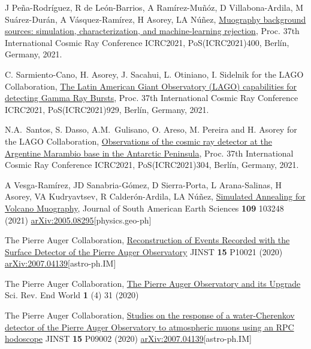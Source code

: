 \begin{etaremune}
\item {} J Peña-Rodríguez, R de León-Barrios, A Ramírez-Muñóz, D Villabona-Ardila, M Suárez-Durán, A Vásquez-Ramírez, H Asorey, LA Núñez, \href{https://doi.org/10.22323/1.395.0400}{Muography background sources: simulation, characterization, and machine-learning rejection}, \en Proc.
37th International Cosmic Ray Conference ICRC2021, PoS(ICRC2021)400, Berlín, Germany, 2021.

\item {} C. Sarmiento-Cano, H. Asorey, J. Sacahui, L. Otiniano, I. Sidelnik for the LAGO Collaboration, \href{https://doi.org/10.22323/1.395.0929}{The Latin American Giant Observatory (LAGO) capabilities for detecting Gamma Ray Bursts}, \en Proc.
37th International Cosmic Ray Conference ICRC2021, PoS(ICRC2021)929, Berlín, Germany, 2021.

\item {} N.A.\ Santos, S. Dasso, A.M.\ Gulisano, O. Areso, M. Pereira and H. Asorey for the LAGO Collaboration, \href{https://doi.org/10.22323/1.395.304}{Observations of the cosmic ray detector at the Argentine Marambio base in the Antarctic Peninsula}, \en Proc.
37th International Cosmic Ray Conference ICRC2021, PoS(ICRC2021)304, Berlín, Germany, 2021.

\item {} A Vesga-Ramírez, JD Sanabria-Gómez, D Sierra-Porta, L Arana-Salinas, H Asorey, VA Kudryavtsev, R Calderón-Ardila, LA Núñez, \href{https://doi.org/10.1016/j.jsames.2021.103248}{{Simulated Annealing for Volcano Muography}}, Journal of South American Earth Sciences {\textbf{109}} 103248 (2021) \href{https://arxiv.org/abs/2005.08295}{arXiv:2005.08295}[physics.geo-ph]

\item {}The Pierre Auger Collaboration, \href{https://doi.org/10.1088/1748-0221/15/10/P10021}{Reconstruction of Events Recorded with the Surface Detector of the Pierre Auger Observatory} JINST {\textbf{15}} P10021 (2020) \href{https://arxiv.org/abs/2007.04139}{arXiv:2007.04139}[astro-ph.IM]

\item {}The Pierre Auger Collaboration, \href{https://doi.org/10.52712/sciencereviews.v1i4.31}{The Pierre Auger Observatory and its Upgrade} Sci.
Rev. End World {\textbf{1}} (4) 31 (2020)

\item {}The Pierre Auger Collaboration, \href{https://doi.org/10.1088/1748-0221/15/09/P09002}{Studies on the response of a water-Cherenkov detector of the Pierre Auger Observatory to atmospheric muons using an RPC hodoscope} JINST {\textbf{15}} P09002 (2020) \href{https://arxiv.org/abs/2007.04139}{arXiv:2007.04139}[astro-ph.IM]


\end{etaremune}
